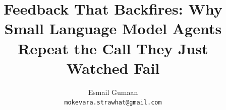 \documentclass{article}
\title{Feedback That Backfires: Why Small Language Model Agents Repeat
the Call They Just Watched Fail}
\author{%
  Esmail Gumaan \\
  \texttt{mokevara.strawhat@gmail.com} \\
}
\begin{document}
\maketitle

\begin{abstract}

\end{abstract}






\appendix



\end{document}
